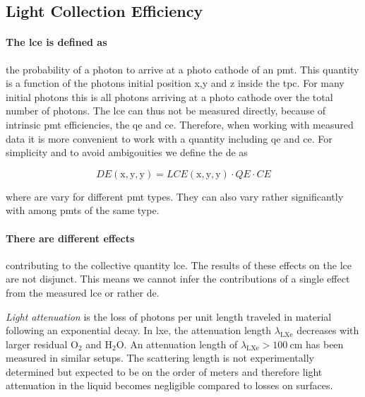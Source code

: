 
\FloatBarrier
\subsection{Light Collection Efficiency}
\label{ssec:lce}
\FloatBarrier



\paragraph{The \gls{lce} is defined as} the probability of a photon to arrive at a photo cathode of an \gls{pmt}.
This quantity is a function of the photons initial position x,y and z inside the \gls{tpc}.
For many initial photons this is all photons arriving at a photo cathode over the total number of photons.
The \gls{lce} can thus not be measured directly, because of intrinsic \gls{pmt} efficiencies, the \gls{qe} and \gls{ce}.
Therefore, when working with measured data it is more convenient to work with a quantity including \gls{qe} and \gls{ce}.
For simplicity and to avoid ambigouities we define the \gls{de} as


\begin{equation}
    \mathit{DE}\left(\mathrm{x}, \mathrm{y}, \mathrm{y}\right) =  \mathit{LCE}\left(\mathrm{x}, \mathrm{y}, \mathrm{y}\right) \cdot \mathit{QE} \cdot \mathit{CE}
\end{equation}

where are vary for different \gls{pmt} types.
They can also vary rather significantly with among \gls{pmt}s of the same type.

\paragraph{There are different effects} contributing to the collective quantity \gls{lce}.
The results of these effects on the \gls{lce} are not disjunct.
This means we cannot infer the contributions of a single effect from the measured \gls{lce} or rather \gls{de}.

\emph{Light attenuation} is the loss of photons per unit length traveled in material following an exponential decay.
In \gls{lxe}, the attenuation length $ \lambda_\mathrm{LXe} $ decreases with larger residual $ \mathrm{O}_2 $ and $ \mathrm{H}_2\mathrm{O} $.
An attenuation length of $ \lambda_\mathrm{LXe} > \SI{100}{\centi\m} $ has been measured in similar setups\cite{}.  %
The scattering length is not experimentally determined but expected to be on the order of meters and therefore light attenuation in the liquid becomes negligible compared to losses on surfaces.

